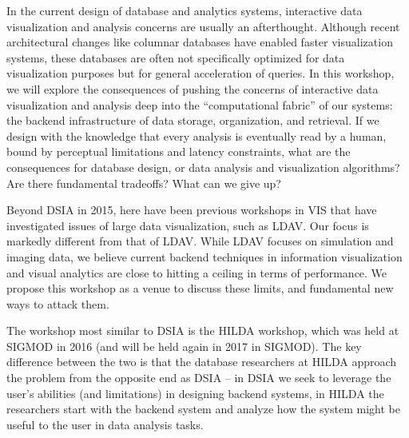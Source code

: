 \documentclass[journal]{vgtc}                %
\begin{document}
In the current design of database and analytics systems, interactive data visualization and analysis concerns are usually an afterthought. 
Although recent architectural changes like columnar databases have enabled faster visualization systems, these databases are often not specifically optimized for data visualization purposes but for general acceleration of queries. 
In this workshop, we will explore the consequences of pushing the concerns of interactive data visualization and analysis deep into the ``computational fabric'' of our systems: the backend infrastructure of data storage, organization, and retrieval. 
If we design with the knowledge that every analysis is eventually read by a human, bound by perceptual limitations and latency constraints, what are the consequences for database design, or data analysis and visualization algorithms? 
Are there fundamental tradeoffs? 
What can we give up?

Beyond DSIA in 2015, here have been previous workshops in VIS that have investigated issues of large data visualization, such as LDAV. 
Our focus is markedly different from that of LDAV. 
While LDAV focuses on simulation and imaging data, we believe current backend techniques in information visualization and visual analytics are close to hitting a ceiling in terms of performance. 
We propose this workshop as a venue to discuss these limits, and fundamental new ways to attack them.

The workshop most similar to DSIA is the HILDA workshop, which was held at SIGMOD in 2016 (and will be held again in 2017 in SIGMOD). 
The key difference between the two is that the database researchers at HILDA approach the problem from the opposite end as DSIA -- in DSIA we seek to leverage the user's abilities (and limitations) in designing backend systems, in HILDA the researchers start with the backend system and analyze how the system might be useful to the user in data analysis tasks.
\end{document}
